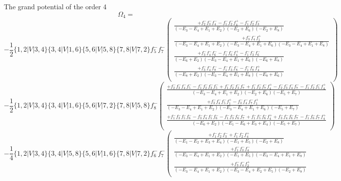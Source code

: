 \documentclass{article}
\begin{document}
The grand potential of the order 4
\[\Omega_{4} = \]
\[-\frac{1}{2}\{1,2|V|3,4\}\{3,4|V|1,6\}\{5,6|V|5,8\}\{7,8|V|7,2\}f_{5}^{-}f_{7}^{-}\left(\begin{array}{rcl}\frac{+f_{2}^{-}f_{3}^{-}f_{4}^{-}-f_{1}^{-}f_{2}^{-}f_{4}^{+}-f_{1}^{-}f_{2}^{-}f_{3}^{-}}{(-E_{3}-E_{4}+E_{1}+E_{2})(-E_{2}+E_{6})(-E_{2}+E_{8})}\\
\frac{+f_{3}^{-}f_{4}^{-}f_{1}^{+}}{(-E_{3}-E_{4}+E_{1}+E_{2})(-E_{3}-E_{4}+E_{1}+E_{6})(-E_{3}-E_{4}+E_{1}+E_{8})}\\
\frac{+f_{3}^{-}f_{4}^{-}f_{6}^{-}-f_{1}^{-}f_{6}^{-}f_{4}^{+}-f_{1}^{-}f_{3}^{-}f_{6}^{-}}{(-E_{6}+E_{2})(-E_{3}-E_{4}+E_{1}+E_{6})(-E_{6}+E_{8})}\\
\frac{+f_{3}^{-}f_{4}^{-}f_{8}^{-}-f_{1}^{-}f_{3}^{-}f_{8}^{-}-f_{1}^{-}f_{8}^{-}f_{4}^{+}}{(-E_{8}+E_{2})(-E_{3}-E_{4}+E_{1}+E_{8})(-E_{8}+E_{6})}\\
\end{array}\right)\]\[-\frac{1}{2}\{1,2|V|3,4\}\{3,4|V|1,6\}\{5,6|V|7,2\}\{7,8|V|5,8\}f_{8}^{-}\left(\begin{array}{rcl}\frac{+f_{2}^{-}f_{3}^{-}f_{4}^{-}f_{5}^{-}-f_{1}^{-}f_{2}^{-}f_{3}^{-}f_{5}^{-}+f_{1}^{-}f_{2}^{-}f_{3}^{-}f_{7}^{-}+f_{1}^{-}f_{2}^{-}f_{7}^{-}f_{4}^{+}-f_{2}^{-}f_{3}^{-}f_{4}^{-}f_{7}^{-}-f_{1}^{-}f_{2}^{-}f_{5}^{-}f_{4}^{+}}{(-E_{3}-E_{4}+E_{1}+E_{2})(-E_{2}+E_{6})(-E_{5}+E_{7})}\\
\frac{+f_{3}^{-}f_{4}^{-}f_{5}^{-}f_{1}^{+}-f_{3}^{-}f_{4}^{-}f_{7}^{-}f_{1}^{+}}{(-E_{3}-E_{4}+E_{1}+E_{2})(-E_{3}-E_{4}+E_{1}+E_{6})(-E_{5}+E_{7})}\\
\frac{+f_{1}^{-}f_{3}^{-}f_{5}^{-}f_{6}^{-}-f_{3}^{-}f_{4}^{-}f_{5}^{-}f_{6}^{-}-f_{1}^{-}f_{3}^{-}f_{6}^{-}f_{7}^{-}+f_{1}^{-}f_{5}^{-}f_{6}^{-}f_{4}^{+}+f_{3}^{-}f_{4}^{-}f_{6}^{-}f_{7}^{-}-f_{1}^{-}f_{6}^{-}f_{7}^{-}f_{4}^{+}}{(-E_{6}+E_{2})(-E_{1}-E_{6}+E_{3}+E_{4})(-E_{5}+E_{7})}\\
\end{array}\right)\]\[-\frac{1}{4}\{1,2|V|3,4\}\{3,4|V|5,8\}\{5,6|V|1,6\}\{7,8|V|7,2\}f_{6}^{-}f_{7}^{-}\left(\begin{array}{rcl}\frac{+f_{1}^{-}f_{2}^{-}f_{3}^{-}+f_{1}^{-}f_{2}^{-}f_{4}^{+}}{(-E_{1}-E_{2}+E_{3}+E_{4})(-E_{1}+E_{5})(-E_{2}+E_{8})}\\
\frac{+f_{1}^{-}f_{3}^{-}f_{4}^{-}}{(-E_{3}-E_{4}+E_{1}+E_{2})(-E_{1}+E_{5})(-E_{3}-E_{4}+E_{1}+E_{8})}\\
\frac{+f_{3}^{-}f_{4}^{-}f_{2}^{+}}{(-E_{3}-E_{4}+E_{1}+E_{2})(-E_{3}-E_{4}+E_{2}+E_{5})(-E_{2}+E_{8})}\\

\end{array}\]
\end{document}
